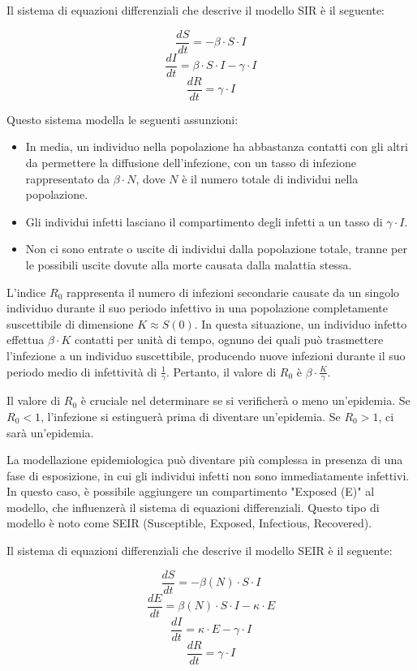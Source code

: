 Il sistema di equazioni differenziali che descrive il modello SIR è il seguente:

\[ \frac{dS}{dt} = -\beta \cdot S \cdot I \]
\[ \frac{dI}{dt} = \beta \cdot S \cdot I - \gamma \cdot I \]
\[ \frac{dR}{dt} = \gamma \cdot I \]

Questo sistema modella le seguenti assunzioni:

\begin{itemize}
    \item In media, un individuo nella popolazione ha abbastanza contatti 
    con gli altri da permettere la diffusione dell'infezione, con un tasso 
    di infezione rappresentato da $\beta \cdot N$, dove $N$ è il numero 
    totale di individui nella popolazione.
    \item Gli individui infetti lasciano il compartimento degli infetti a 
    un tasso di $\gamma \cdot I$.
    \item Non ci sono entrate o uscite di individui dalla popolazione 
    totale, tranne per le possibili uscite dovute alla morte causata 
    dalla malattia stessa.
\end{itemize}

L'indice $R_0$ rappresenta il numero di infezioni secondarie causate da 
un singolo individuo durante il suo periodo infettivo in una popolazione 
completamente suscettibile di dimensione $K \approx S(0)$. In questa 
situazione, un individuo infetto effettua $\beta \cdot K$ contatti per 
unità di tempo, ognuno dei quali può trasmettere l'infezione a un 
individuo suscettibile, producendo nuove infezioni durante il suo periodo 
medio di infettività di $\frac{1}{\gamma}$. Pertanto, il valore 
di $R_0$ è $\beta \cdot \frac{K}{\gamma}$.

Il valore di $R_0$ è cruciale nel determinare se si verificherà o meno 
un'epidemia. Se $R_0 < 1$, l'infezione si estinguerà prima di diventare 
un'epidemia. Se $R_0 > 1$, ci sarà un'epidemia.

La modellazione epidemiologica può diventare più complessa in presenza 
di una fase di esposizione, in cui gli individui infetti non sono 
immediatamente infettivi. In questo caso, è possibile aggiungere un 
compartimento "Exposed (E)" al modello, che influenzerà il sistema di 
equazioni differenziali. Questo tipo di modello è noto come SEIR 
(Susceptible, Exposed, Infectious, Recovered).

Il sistema di equazioni differenziali che descrive il modello SEIR è il seguente:

\[ \frac{dS}{dt} = - \beta(N) \cdot S \cdot I \]
\[ \frac{dE}{dt} = \beta(N) \cdot S \cdot I - \kappa \cdot E \]
\[ \frac{dI}{dt} = \kappa \cdot E - \gamma \cdot I \]
\[ \frac{dR}{dt} = \gamma \cdot I \]

